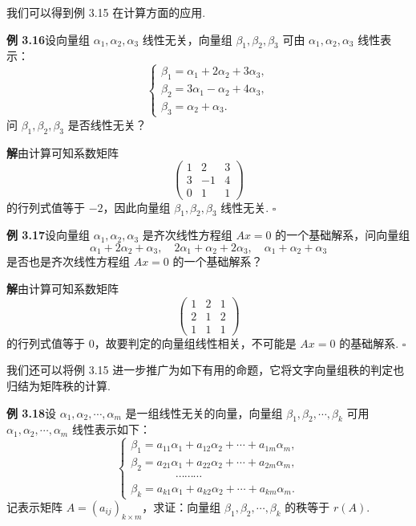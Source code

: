 \documentclass[UTF8,12pt,a4paper,fontset=fandol]{ctexart}
\begin{document}
我们可以得到例 3.15 在计算方面的应用.

\noindent\textbf{例 3.16}\quad 设向量组 $\alpha_1,\alpha_2,\alpha_3$ 线性无关，向量组 $\beta_1,\beta_2,\beta_3$ 可由 $\alpha_1,\alpha_2,\alpha_3$ 线性表示：
\[
\left\{
\begin{array}{l}
\beta_1=\alpha_1+2\alpha_2+3\alpha_3,\\
\beta_2=3\alpha_1-\alpha_2+4\alpha_3,\\
\beta_3=\alpha_2+\alpha_3.
\end{array}
\right.
\]
问 $\beta_1,\beta_2,\beta_3$ 是否线性无关？

\noindent\textbf{解}\quad 由计算可知系数矩阵
\[
\begin{pmatrix}
1 & 2 & 3\\
3 & -1 & 4\\
0 & 1 & 1
\end{pmatrix}
\]
的行列式值等于 $-2$，因此向量组 $\beta_1,\beta_2,\beta_3$ 线性无关. $\square$

\noindent\textbf{例 3.17}\quad 设向量组 $\alpha_1,\alpha_2,\alpha_3$ 是齐次线性方程组 $Ax=0$ 的一个基础解系，问向量组
\[
\alpha_1+2\alpha_2+\alpha_3,\quad 2\alpha_1+\alpha_2+2\alpha_3,\quad \alpha_1+\alpha_2+\alpha_3
\]
是否也是齐次线性方程组 $Ax=0$ 的一个基础解系？

\noindent\textbf{解}\quad 由计算可知系数矩阵
\[
\begin{pmatrix}
1 & 2 & 1\\
2 & 1 & 2\\
1 & 1 & 1
\end{pmatrix}
\]
的行列式值等于 0，故要判定的向量组线性相关，不可能是 $Ax=0$ 的基础解系. $\square$

我们还可以将例 3.15 进一步推广为如下有用的命题，它将文字向量组秩的判定也归结为矩阵秩的计算.

\noindent\textbf{例 3.18}\quad 设 $\alpha_1,\alpha_2,\cdots,\alpha_m$ 是一组线性无关的向量，向量组 $\beta_1,\beta_2,\cdots,\beta_k$ 可用 $\alpha_1,\alpha_2,\cdots,\alpha_m$ 线性表示如下：
\[
\left\{
\begin{array}{l}
\beta_1=a_{11}\alpha_1+a_{12}\alpha_2+\cdots+a_{1m}\alpha_m,\\
\beta_2=a_{21}\alpha_1+a_{22}\alpha_2+\cdots+a_{2m}\alpha_m,\\
\hspace{4em}\cdots\cdots\cdots\\
\beta_k=a_{k1}\alpha_1+a_{k2}\alpha_2+\cdots+a_{km}\alpha_m.
\end{array}
\right.
\]
记表示矩阵 $A=(a_{ij})_{k\times m}$，求证：向量组 $\beta_1,\beta_2,\cdots,\beta_k$ 的秩等于 $r(A)$.
\end{document}
